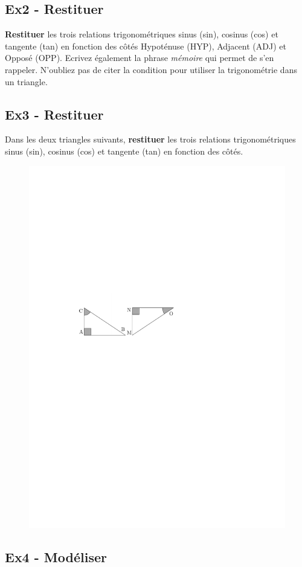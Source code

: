 \documentclass[12pt]{article}
\begin{document}
\subsection*{Ex2 - Restituer}

\textbf{Restituer} les trois relations trigonométriques sinus (sin), cosinus (cos) et tangente (tan) en fonction des côtés Hypoténuse (HYP), Adjacent (ADJ) et Opposé (OPP). Ecrivez également la phrase \textit{mémoire} qui permet de s'en rappeler. N'oubliez pas de citer la condition pour utiliser la trigonométrie dans un triangle.

\subsection*{Ex3 - Restituer}

\begin{multicols}{2}

  Dans les deux triangles suivants, \textbf{restituer} les trois relations trigonométriques sinus (sin), cosinus (cos) et tangente (tan) en fonction des côtés.

  \begin{figure}[H]
    \centering
    \includegraphics[width=0.6 \linewidth]{4x2-trigonometrie/sources/trigo-ex3a.pdf}
  \end{figure}
\end{multicols}

\subsection*{Ex4 - Modéliser}
\end{document}
